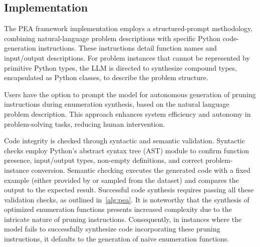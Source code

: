 \subsection{Implementation}\label{sec:implementation}
The PEA framework implementation employs a structured-prompt methodology, combining natural-language problem descriptions with specific Python code-generation instructions. These instructions detail function names and input/output descriptions. For problem instances that cannot be represented by primitive Python types, the LLM is directed to synthesize compound types, encapsulated as Python classes, to describe the problem structure. %

Users have the option to prompt the model for autonomous generation of pruning instructions during enumeration synthesis, based on the natural language problem description. This approach enhances system efficiency and autonomy in problem-solving tasks, reducing human intervention.

Code integrity is checked through syntactic and semantic validation. Syntactic checks employ Python's abstract syntax tree (AST) module to confirm function presence, input/output types, non-empty definitions, and correct problem-instance conversion. Semantic checking executes the generated code with a fixed example (either provided by or sampled from the dataset) and compares the output to the expected result. Successful code synthesis requires passing all these validation checks, as outlined in~\cref{alg:pea}. It is noteworthy that the synthesis of optimized enumeration functions presents increased complexity due to the intricate nature of pruning instructions. Consequently, in instances where the model fails to successfully synthesize code incorporating these pruning instructions, it defaults to the generation of naive enumeration functions. %




